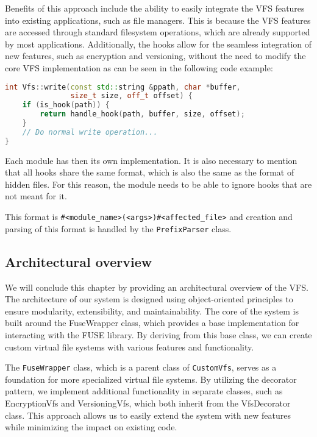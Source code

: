 Benefits of this approach include the ability to easily integrate the VFS features into existing applications, such as file managers.
This is because the VFS features are accessed through standard filesystem operations, which are already supported by most applications.
Additionally, the hooks allow for the seamless integration of new features, such as encryption and versioning, without the need to modify the core VFS implementation as can be seen in the following code example:

\begin{lstlisting}[language=c++, caption={Example of hook implementation}, basicstyle=\ttfamily\small]
int Vfs::write(const std::string &ppath, char *buffer,
               size_t size, off_t offset) {
    if (is_hook(path)) {
        return handle_hook(path, buffer, size, offset);
    }
    // Do normal write operation...
}
\end{lstlisting}

Each module has then its own implementation.
It is also necessary to mention that all hooks share the same format, which is also the same as the format of hidden files.
For this reason, the module needs to be able to ignore hooks that are not meant for it.

This format is \texttt{\#<module\_name>\-(<args>)\#<affected\_file>} and creation and parsing of this format is handled by the \texttt{PrefixParser} class.

\subsection{Architectural overview}\label{subsec:overview}

We will conclude this chapter by providing an architectural overview of the VFS\@.
The architecture of our system is designed using object-oriented principles to ensure modularity, extensibility, and maintainability.
The core of the system is built around the FuseWrapper class, which provides a base implementation for interacting with the FUSE library.
By deriving from this base class, we can create custom virtual file systems with various features and functionality.

The \texttt{FuseWrapper} class, which is a parent class of \texttt{CustomVfs}, serves as a foundation for more specialized virtual file systems.
By utilizing the decorator pattern, we implement additional functionality in separate classes, such as EncryptionVfs and VersioningVfs, which both inherit from the VfsDecorator class.
This approach allows us to easily extend the system with new features while minimizing the impact on existing code.


